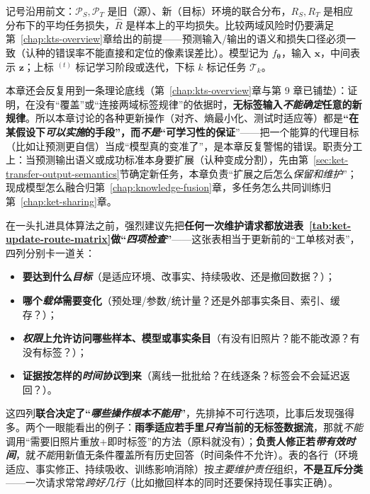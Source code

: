 记号沿用前文：$\mathcal P_S,\mathcal P_T$ 是旧（源）、新（目标）环境的联合分布，$R_S,R_T$ 是相应分布下的平均任务损失，$\hat R$ 是样本上的平均损失。比较两域风险时仍要满足第~\ref{chap:kts-overview}章给出的前提——预测输入/输出的语义和损失口径必须一致（认种的错误率不能直接和定位的像素误差比）。模型记为 $f_{\bm{\theta}}$，输入 $\bm{x}$，中间表示 $\bm{z}$；上标 $^{(t)}$ 标记学习阶段或迭代，下标 $k$ 标记任务 $\mathcal T_k$。

本章还会反复用到一条理论底线（第~\ref{chap:kts-overview}章与第 9 章已铺垫）：证明，在没有“覆盖”或“连接两域标签规律”的依据时，\textbf{无标签输入\emph{不能确定}任意的新规律}。所以本章讨论的各种更新操作（对齐、熵最小化、测试时适应等）都是\textbf{“在某假设下\emph{可以实施}的手段”，而\emph{不是}“可学习性的保证}”——把一个能算的代理目标（比如让预测更自信）当成“模型真的变准了”，是本章反复警惕的错误。职责分工上：当预测输出语义或成功标准本身要扩展（认种变成分割），先由第~\ref{sec:ket-transfer-output-semantics}节确定新任务，本章负责“扩展之后怎么\emph{保留和维护}”；现成模型怎么融合归第~\ref{chap:knowledge-fusion}章，多任务怎么共同训练归第~\ref{chap:ket-sharing}章。

在一头扎进具体算法之前，强烈建议先把\textbf{任何一次维护请求都放进表~\ref{tab:ket-update-route-matrix}做“\emph{四项检查}”}——这张表相当于更新前的“工单核对表”，四列分别卡一道关：
\begin{itemize}\item \textbf{要达到什么\emph{目标}}（是适应环境、改事实、持续吸收、还是撤回数据？）；\item \textbf{哪个\emph{载体}需要变化}（预处理/参数/统计量？还是外部事实条目、索引、缓存？）；\item \textbf{\emph{权限}上允许访问哪些样本、模型或事实条目}（有没有旧照片？能不能改源？有没有标签？）；\item \textbf{证据按怎样的\emph{时间协议}到来}（离线一批批给？在线逐条？标签会不会延迟返回？）。\end{itemize}
这四列\textbf{联合决定了“\emph{哪些操作\emph{根本不能用}}”}，先排掉不可行选项，比事后发现强得多。两个一眼能看出的例子：\textbf{雨季适应若手里\emph{只有}当前的无标签数据流}，那就\emph{不能}调用“需要旧照片重放+即时标签”的方法（原料就没有）；\textbf{负责人修正若\emph{带有效时间}}，就\emph{不能}用新值无条件覆盖所有历史回答（时间条件不允许）。表的各行（环境适应、事实修正、持续吸收、训练影响消除）按\emph{主要维护责任}组织，\textbf{不是互斥分类}——一次请求常常\emph{跨好几行}（比如撤回样本的同时还要保持现任事实正确）。


